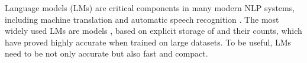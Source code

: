 Language models (LMs) are critical components in many modern NLP systems, including machine translation \cite{koehn2010book} and automatic speech recognition \cite{rab93book}.
%
The most widely used LMs are \ngram models \cite{chen1996empirical},
based on explicit storage of \ngrams and their counts, 
which have proved highly accurate when trained on large datasets.
%
%
To be useful, LMs need to be not only accurate but also fast and compact.

%
%



